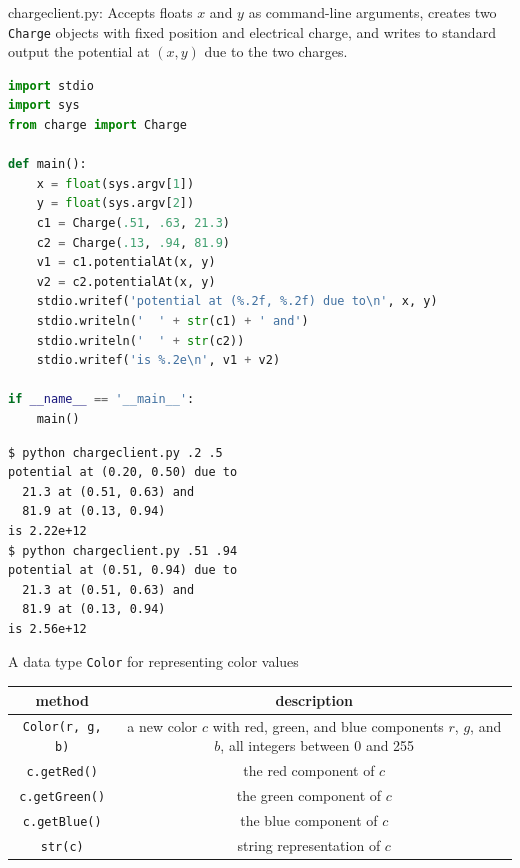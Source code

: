 \documentclass[8pt,a4paper,compress,handout]{beamer}
\begin{document}
\begin{frame}[fragile]
\begin{framed}
\tiny chargeclient.py: Accepts floats $x$ and $y$ as command-line arguments, creates two \lstinline{Charge} objects with fixed position and electrical charge, and writes to standard output the potential at $(x, y)$ due to the two charges.
\end{framed}

\begin{lstlisting}[language=Python]
import stdio
import sys
from charge import Charge

def main():
    x = float(sys.argv[1])
    y = float(sys.argv[2])
    c1 = Charge(.51, .63, 21.3)
    c2 = Charge(.13, .94, 81.9)
    v1 = c1.potentialAt(x, y)
    v2 = c2.potentialAt(x, y)
    stdio.writef('potential at (%.2f, %.2f) due to\n', x, y)
    stdio.writeln('  ' + str(c1) + ' and')
    stdio.writeln('  ' + str(c2))
    stdio.writef('is %.2e\n', v1 + v2)

if __name__ == '__main__':
    main()
\end{lstlisting}

\begin{lstlisting}[language={}]
$ python chargeclient.py .2 .5
potential at (0.20, 0.50) due to
  21.3 at (0.51, 0.63) and
  81.9 at (0.13, 0.94)
is 2.22e+12
$ python chargeclient.py .51 .94
potential at (0.51, 0.94) due to
  21.3 at (0.51, 0.63) and
  81.9 at (0.13, 0.94)
is 2.56e+12
\end{lstlisting}
\end{frame}

\begin{frame}[fragile]
A data type \lstinline{Color} for representing color values
\begin{center}
\begin{tabular}{cc}
method & description \\ \hline
\lstinline$Color(r, g, b)$ & \makecell{a new color $c$ with red, green, and blue components \\ $r$, $g$, and $b$, all integers between 0 and 255} \\
\lstinline$c.getRed()$ & the red component of $c$ \\
\lstinline$c.getGreen()$ & the green component of $c$ \\
\lstinline$c.getBlue()$ & the blue component of $c$ \\
\lstinline$str(c)$ & string representation of $c$
\end{tabular} 
\end{center}
\end{frame}
\end{document}
